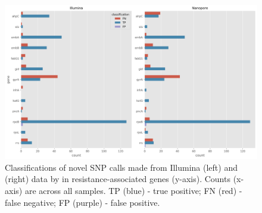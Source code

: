 \begin{figure}
\begin{center}
\includegraphics[width=0.90\columnwidth]{Chapter3/Figs/novel_classifications.png}
\caption{{Classifications of novel SNP calls made from Illumina (left) and \ont{} (right) data by \drprg{} in resistance-associated genes (y-axis). Counts (x-axis) are across all samples. TP (blue) - true positive; FN (red) - false negative; FP (purple) - false positive.
{\label{fig:novel-classifications}}
}}
\end{center}
\end{figure}

